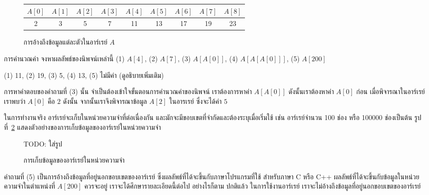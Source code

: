 \begin{figure}
\begin{center}
\begin{tabular}{|c|c|c|c|c|c|c|c|c|}
\hline
$A[0]$ & $A[1]$ & $A[2]$ & $A[3]$ & $A[4]$ & $A[5]$ & $A[6]$ & $A[7]$ & $A[8]$ \\
\hline
2 & 3 & 5 & 7 & 11 & 13 & 17 & 19 & 23\\
\hline
\end{tabular}
\end{center}
\caption{การ{\wbr}อ้าง{\wbr}ถึง{\wbr}ข้อมูล{\wbr}แต่ละ{\wbr}ตัว{\wbr}ใน{\wbr}อาร์เรย์ $A$}
\label{fig:array-array-access}
\end{figure}


\begin{quiz}{การ{\wbr}คำนวณ{\wbr}ค่า}
จง{\wbr}หา{\wbr}ผลลัพธ์{\wbr}ของ{\wbr}นิพจน์{\wbr}เหล่านี้ (1) $A[4]$, (2) $A[7]$, (3) $A[A[0]]$, (4) $A[A[A[0]]]$, (5) $A[200]$
\end{quiz}
\begin{quizans}
(1) 11, (2) 19, (3) 5, (4) 13, (5) ไม่{\wbr}มี{\wbr}ค่า (ดู{\wbr}อธิบาย{\wbr}เพิ่มเติม)
\end{quizans}

การ{\wbr}หา{\wbr}คำตอบ{\wbr}ของ{\wbr}คำถาม{\wbr}ที่ (3) นั้น จำเป็น{\wbr}ต้อง{\wbr}เข้าใจ{\wbr}ขั้นตอน{\wbr}การ{\wbr}คำนวณ{\wbr}ค่า{\wbr}ของ{\wbr}นิพจน์{\wbr}
เรา{\wbr}ต้องการ{\wbr}หา{\wbr}ค่า $A[A[0]]$ ดังนั้น{\wbr}เรา{\wbr}ต้องหา{\wbr}ค่า $A[0]$ ก่อน{\wbr}
เมื่อ{\wbr}พิจารณา{\wbr}ใน{\wbr}อาร์เรย์{\wbr}เรา{\wbr}พบ{\wbr}ว่า $A[0]$ คือ $2$ ดังนั้น จากนั้น{\wbr}เรา{\wbr}จึง{\wbr}พิจารณา{\wbr}ข้อมูล{\wbr}
$A[2]$ ใน{\wbr}อา{\wbr}รเรย์ ซึ่ง{\wbr}จะ{\wbr}ได้{\wbr}ค่า $5$

ใน{\wbr}การ{\wbr}ทำงาน{\wbr}จริง อาร์เรย์จะ{\wbr}เก็บ{\wbr}ใน{\wbr}หน่วยความจำ{\wbr}ที่{\wbr}ต่อเนื่อง{\wbr}กัน{\wbr}
และ{\wbr}มักจะ{\wbr}มี{\wbr}ขอบเขต{\wbr}ที่{\wbr}จำกัด{\wbr}และ{\wbr}ต้อง{\wbr}ระบุ{\wbr}เมื่อ{\wbr}เริ่ม{\wbr}ใช้ เช่น อาร์เรย์จำนวน 100 ช่อง หรือ{\wbr}
100000 ช่อง{\wbr}เป็นต้น รูป{\wbr}ที่~\ref{fig:array-array-in-mem}
แสดง{\wbr}ตัวอย่าง{\wbr}ของ{\wbr}การ{\wbr}เก็บ{\wbr}ข้อมูล{\wbr}ของ{\wbr}อาร์เรย์{\wbr}ใน{\wbr}หน่วยความจำ{\wbr}

\begin{figure}
TODO: ใส่{\wbr}รูป{\wbr}
\caption{การ{\wbr}เก็บ{\wbr}ข้อมูล{\wbr}ของ{\wbr}อาร์เรย์{\wbr}ใน{\wbr}หน่วยความจำ}
\label{fig:array-array-in-mem}
\end{figure}

คำถาม{\wbr}ที่ (5) เป็น{\wbr}การ{\wbr}อ้าง{\wbr}ถึง{\wbr}ข้อมูล{\wbr}ที่อยู่{\wbr}นอก{\wbr}ขอบเขต{\wbr}ของ{\wbr}อาร์เรย์
ซึ่ง{\wbr}ผลลัพธ์{\wbr}ที่{\wbr}ได้{\wbr}จะ{\wbr}ขึ้น{\wbr}กับ{\wbr}ภาษา{\wbr}โปรแกรม{\wbr}ที่{\wbr}ใช้ สำหรับ{\wbr}ภาษา C หรือ C++
ผลลัพธ์{\wbr}ที่{\wbr}ได้{\wbr}จะ{\wbr}ขึ้น{\wbr}กับ{\wbr}ข้อมูล{\wbr}ใน{\wbr}หน่วยความจำ{\wbr}ใน{\wbr}ตำแหน่ง{\wbr}ที่ $A[200]$ ควร{\wbr}จะ{\wbr}อยู่{\wbr}
เรา{\wbr}จะ{\wbr}ได้{\wbr}ศึกษา{\wbr}รายละเอียด{\wbr}นี้{\wbr}ต่อไป อย่างไรก็ตาม ปกติ{\wbr}แล้ว ใน{\wbr}การ{\wbr}ใช้{\wbr}งาน{\wbr}อาร์เรย์
เรา{\wbr}จะ{\wbr}ไม่{\wbr}อ้าง{\wbr}ถึง{\wbr}ข้อมูล{\wbr}ที่อยู่{\wbr}นอก{\wbr}ขอบเขต{\wbr}ของ{\wbr}อาร์เรย์

